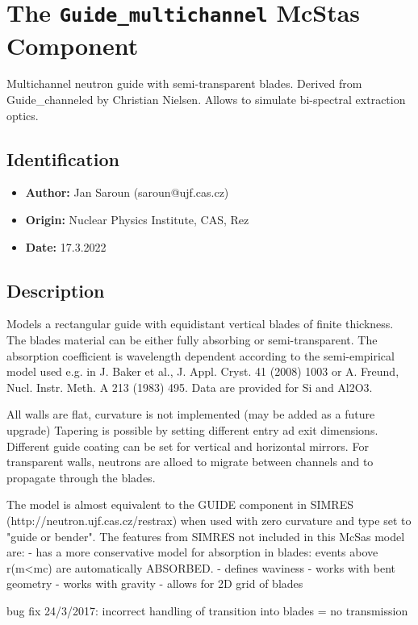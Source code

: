 \section{The \texttt{Guide\_multichannel} McStas Component}
Multichannel neutron guide with semi-transparent blades.
Derived from Guide\_channeled by Christian Nielsen.
Allows to simulate bi-spectral extraction optics.

\subsection*{Identification}
\begin{itemize}
  \item \textbf{Author:} Jan Saroun (saroun@ujf.cas.cz)
  \item \textbf{Origin:} Nuclear Physics Institute, CAS, Rez
  \item \textbf{Date:} 17.3.2022
\end{itemize}

\subsection*{Description}
Models a rectangular guide with equidistant vertical blades of finite thickness. The blades material can be either fully absorbing or semi-transparent. The absorption coefficient is wavelength dependent according to the semi-empirical model used e.g. in J. Baker et al., J. Appl. Cryst. 41 (2008) 1003 or A. Freund, Nucl. Instr. Meth. A 213 (1983) 495. Data are provided for Si and Al2O3.

All walls are flat, curvature is not implemented (may be added as a future upgrade) Tapering is possible by setting different entry ad exit dimensions. Different guide coating can be set for vertical and horizontal mirrors. For transparent walls, neutrons are alloed to migrate between channels and to propagate through the blades.

The model is almost equivalent to the GUIDE component in SIMRES (http://neutron.ujf.cas.cz/restrax) when used with zero curvature and type set to "guide or bender". The features from SIMRES not included in this McSas model are: - has a more conservative model for absorption in blades: events above r(m\textless{}mc) are automatically ABSORBED. - defines waviness - works with bent geometry - works with gravity - allows for 2D grid of blades

bug fix 24/3/2017: incorrect handling of transition into blades = no transmission

